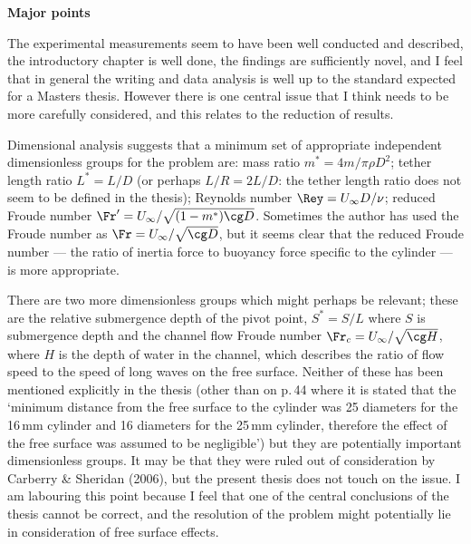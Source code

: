 \documentclass[12pt,twoside]{letter}
\begin{document}
\textbf{Major points}

The experimental measurements seem to have been well conducted and
described, the introductory chapter is well done, the findings are
sufficiently novel, and I feel that in general the writing and data
analysis is well up to the standard expected for a Masters
thesis. However there is one central issue that I think needs to be
more carefully considered, and this relates to the reduction of
results.

Dimensional analysis suggests that a minimum set of appropriate
independent dimensionless groups for the problem are: mass ratio
$m^\ast=4m/\pi\rho D^2$; tether length ratio $L^\ast=L/D$ (or perhaps
$L/R=2L/D$: the tether length ratio does not seem to be defined in the
thesis); Reynolds number $\Rey=U_\infty D/\nu$; reduced Froude number
$\Fr^\prime=U_\infty/\sqrt{(1-m^\ast)\cg D}$.  Sometimes the author
has used the Froude number as $\Fr=U_\infty/\sqrt{\cg D}$, but it
seems clear that the reduced Froude number --- the ratio of inertia
force to buoyancy force specific to the cylinder --- is more
appropriate.

There are two more dimensionless groups which might perhaps be
relevant; these are the relative submergence depth of the pivot point,
$S^\ast=S/L$ where $S$ is submergence depth and the channel flow
Froude number $\Fr_c=U_\infty/\sqrt{\cg H}$, where $H$ is the depth of
water in the channel, which describes the ratio of flow speed to the
speed of long waves on the free surface. Neither of these has been
mentioned explicitly in the thesis (other than on p.\,44 where it is
stated that the `minimum distance from the free surface to the
cylinder was 25 diameters for the 16\,mm cylinder and 16 diameters for
the 25\,mm cylinder, therefore the effect of the free surface was
assumed to be negligible') but they are potentially important
dimensionless groups. It may be that they were ruled out of
consideration by Carberry \& Sheridan (2006), but the present thesis
does not touch on the issue. I am labouring this point because I feel
that one of the central conclusions of the thesis cannot be correct,
and the resolution of the problem might potentially lie in
consideration of free surface effects.
\end{document}
